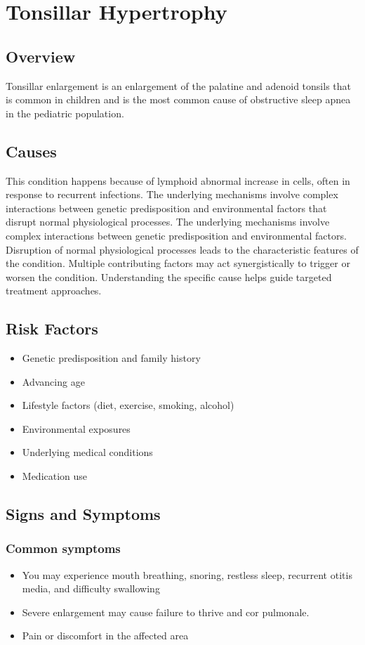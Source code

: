 \chapter{Tonsillar Hypertrophy}
\label{sec:Tonsillar Hypertrophy}

\section{Overview}
Tonsillar enlargement is an enlargement of the palatine and adenoid tonsils that is common in children and is the most common cause of obstructive sleep apnea in the pediatric population.
\section{Causes}
This condition happens because of lymphoid abnormal increase in cells, often in response to recurrent infections. The underlying mechanisms involve complex interactions between genetic predisposition and environmental factors that disrupt normal physiological processes. The underlying mechanisms involve complex interactions between genetic predisposition and environmental factors. Disruption of normal physiological processes leads to the characteristic features of the condition. Multiple contributing factors may act synergistically to trigger or worsen the condition. Understanding the specific cause helps guide targeted treatment approaches.
\section{Risk Factors}


\begin{itemize}[noitemsep]
  \item Genetic predisposition and family history
  \item Advancing age
  \item Lifestyle factors (diet, exercise, smoking, alcohol)
  \item Environmental exposures
  \item Underlying medical conditions
  \item Medication use
\end{itemize}
\section{Signs and Symptoms}

\subsection{Common symptoms}
\begin{itemize}[noitemsep]
  \item You may experience mouth breathing, snoring, restless sleep, recurrent otitis media, and difficulty swallowing
  \item Severe enlargement may cause failure to thrive and cor pulmonale.
  \item Pain or discomfort in the affected area
  \end{itemize}

